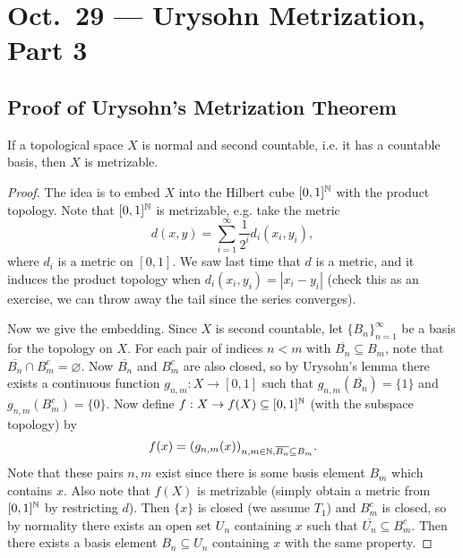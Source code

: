 \chapter{Oct.~29 --- Urysohn Metrization, Part 3}

\section{Proof of Urysohn's Metrization Theorem}

\begin{theorem}
  If a topological space $X$ is normal and second countable, i.e. it
  has a countable basis, then
  $X$ is metrizable.
\end{theorem}

\begin{proof}
  The idea is to embed $X$ into the Hilbert cube
  $[0, 1]^{\mathbb{N}}$ with the product topology. Note that
  $[0, 1]^{\mathbb{N}}$ is metrizable, e.g. take the metric
  \[
    d(x, y) = \sum_{i = 1}^\infty \frac{1}{2^i} 
    d_i(x_i, y_i),
  \]
  where $d_i$ is a metric on $[0, 1]$. We saw last
  time that $d$ is a metric, and it induces
  the product topology when $d_i(x_i, y_i) = |x_i - y_i|$
  (check this as an exercise,
  we can throw away the tail since the series
  converges).

  Now we give the embedding. Since $X$ is second
  countable, let $\{B_n\}_{n = 1}^\infty$ be a
  basis for the topology on $X$. For each pair of
  indices $n < m$ with $\overline{B_n} \subseteq B_m$,
  note that $\overline{B_n} \cap B_m^c = \varnothing$.
  Now $\overline{B_n}$ and $B_m^c$ are also
  closed, so by Urysohn's lemma there exists a
  continuous
  function $g_{n, m} : X \to [0, 1]$ such that
  $g_{n, m}(\overline{B_n}) = \{1\}$ and
  $g_{n, m}(B_m^c) = \{0\}$. Now define
  $f : X \to f(X) \subseteq [0, 1]^{\mathbb{N}}$ (with the
  subspace topology) by
  \[
    f(x) = (g_{n, m}(x))_{n, m \in \mathbb{N}, \overline{B_n} \subseteq B_m}.
  \]
  Note that these pairs $n, m$ exist since
  there is some basis element $B_m$ which contains
  $x$. Also note that $f(X)$ is metrizable (simply
  obtain a metric from $[0, 1]^{\mathbb{N}}$ by restricting
  $d$).
  Then $\{x\}$ is closed (we
  assume $T_1$) and $B_m^c$ is closed, so by
  normality there exists an open set $U_n$ containing
  $x$ such that $\overline{U_n} \subseteq B_m^c$.
  Then there exists a basis element $B_n \subseteq U_n$
  containing $x$ with the same property.


\end{proof}
